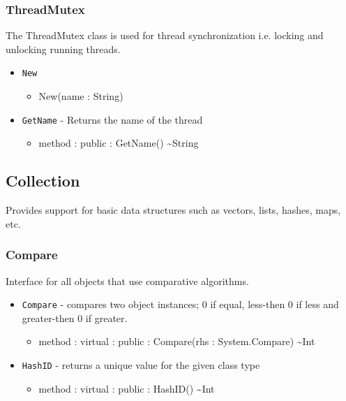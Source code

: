 \documentclass[11pt]{article}
\begin{document}
\subsubsection{ThreadMutex}
The ThreadMutex class is used for thread synchronization i.e. locking
and unlocking running threads.
\begin{itemize}
\item \texttt{New}
  \begin{itemize}
  \item New(name : String)
  \end{itemize}
\item \texttt{GetName} - Returns the name of the thread
  \begin{itemize}
  \item method : public : GetName() \textasciitilde String
  \end{itemize}
\end{itemize}

\subsection{Collection}
Provides support for basic data structures such as vectors, lists,
hashes, maps, etc.

\subsubsection{Compare}
Interface for all objects that use comparative algorithms.
\begin{itemize}
\item \texttt{Compare} - compares two object instances; 0 if equal,
  less-then 0 if less and greater-then 0 if greater.
  \begin{itemize}
  \item method : virtual : public : Compare(rhs : System.Compare)
    \textasciitilde Int
  \end{itemize}
\item \texttt{HashID} - returns a unique value for the given class
  type
  \begin{itemize}
  \item method : virtual : public : HashID() \textasciitilde Int
  \end{itemize}
\end{itemize}
\end{document}
